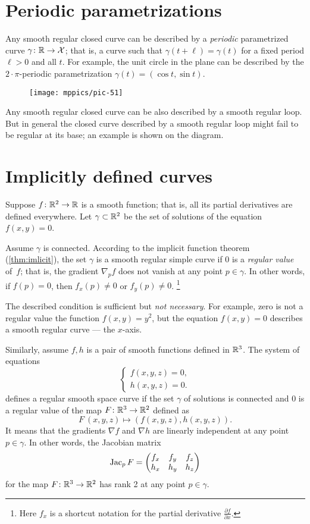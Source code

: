 \section{Periodic parametrizations}

Any smooth regular closed curve can be described by a \emph{periodic} parametrized curve $\gamma\colon \mathbb{R}\to \mathcal{X}$; that is, a curve such that $\gamma(t+\ell)=\gamma(t)$ for a fixed period $\ell > 0$ and all $t$.
For example, the unit circle in the plane can be described by the $2{\cdot}\pi$-periodic parametrization $\gamma(t)=(\cos t,\sin t)$.

{

\begin{wrapfigure}{o}{17 mm}
\vskip-2mm
\centering
\texttt{[image: mppics/pic-51]}
\end{wrapfigure}

Any smooth regular closed curve can be also described by a smooth regular loop.
But in general the closed curve described by a smooth regular loop might fail to be regular at its base; an example is shown on the diagram.

}

\section{Implicitly defined curves}

Suppose $f\colon\mathbb{R}^2\to \mathbb{R}$ is a smooth function; 
that is, all its partial derivatives are defined everywhere.
Let $\gamma\subset \mathbb{R}^2$ be the set of solutions of the equation $f(x,y)=0$.

Assume $\gamma$ is connected.
According to the implicit function theorem (\ref{thm:imlicit}), the set $\gamma$ is a smooth regular simple curve if $0$ is a \emph{regular value} of~$f$; that is, the gradient $\nabla_p f$ does not vanish at any point $p\in \gamma$.
In other words, if $f(p)=0$, then   
$f_x(p)\ne 0$ or $f_y(p)\ne 0$.%
\footnote{Here $f_x$ is a shortcut notation for the partial derivative
$\tfrac{\partial f}{\partial x}$.}

The described condition is sufficient but {}\emph{not necessary}.
For example, zero is not a regular value the function $f(x,y)=y^2$, but the equation $f(x,y)=0$ describes a smooth regular curve --- the $x$-axis.


Similarly, assume $f,h$ is a pair of smooth functions defined in $\mathbb{R}^3$.
The system of equations
\[\begin{cases}
   f(x,y,z)=0,
   \\
   h(x,y,z)=0.
  \end{cases}
\]
defines a regular smooth space curve if the set $\gamma$ of solutions is connected and $0$ is a regular value of the map $F\colon\mathbb{R}^3\to\mathbb{R}^2$ defined as
\[F\:(x,y,z)\mapsto (f(x,y,z),h(x,y,z)).\]
It means that the gradients $\nabla f$ and $\nabla h$ are linearly independent at any point $p\in \gamma$.
In other words, the Jacobian matrix
\[
\mathop{\rm Jac}\nolimits_pF=\begin{pmatrix}
f_x&f_y&f_z\\
h_x&h_y&h_z
\end{pmatrix}
\]
for the map $F\colon\mathbb{R}^3\to\mathbb{R}^2$ has rank 2 at any point $p \in \gamma$.

